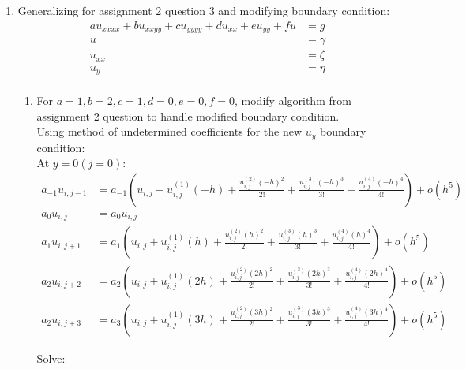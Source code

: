 \documentclass[12pt,letter]{article}
\begin{document}
\begin{enumerate}
  \pagebreak
  
\item
  
  Generalizing for assignment 2 question 3 and modifying boundary condition:\\
  \begin{align*}
    au_{xxxx} + bu_{xxyy} + cu_{yyyy} + du_{xx} + eu_{yy} + f u & = g\\
    u & = \gamma\\
    u_{xx} & =\zeta\\
    u_{y} & =\eta\\
  \end{align*}

  \begin{enumerate}
  \item For $a=1,b=2,c=1,d=0,e=0,f=0$, modify algorithm from assignment 2 question to handle modified boundary condition.\\

    Using method of undetermined coefficients for the new $u_y$ boundary condition:\\

    At $y=0 (j=0)$:
    \begin{align*}
      a_{-1} u_{i,j-1} & = a_{-1}(u_{i,j}+u_{i,j}^{(1)}(-h)+ \frac{u_{i,j}^{(2)}(-h)^2}{2!} + \frac{u_{i,j}^{(3)}(-h)^3}{3!} + \frac{u_{i,j}^{(4)}(-h)^4}{4!}) + o(h^5)\\
      a_{0} u_{i,j} & = a_{0} u_{i,j}\\
      a_{1} u_{i,j+1} & = a_{1}(u_{i,j}+u_{i,j}^{(1)}(h)+ \frac{u_{i,j}^{(2)}(h)^2}{2!} + \frac{u_{i,j}^{(3)}(h)^3}{3!} + \frac{u_{i,j}^{(4)}(h)^4}{4!}) + o(h^5)\\
      a_{2} u_{i,j+2} & = a_{2}(u_{i,j}+u_{i,j}^{(1)}(2h)+ \frac{u_{i,j}^{(2)}(2h)^2}{2!} + \frac{u_{i,j}^{(3)}(2h)^3}{3!} + \frac{u_{i,j}^{(4)}(2h)^4}{4!}) + o(h^5)\\
      a_{2} u_{i,j+3} & = a_{3}(u_{i,j}+u_{i,j}^{(1)}(3h)+ \frac{u_{i,j}^{(2)}(3h)^2}{2!} + \frac{u_{i,j}^{(3)}(3h)^3}{3!} + \frac{u_{i,j}^{(4)}(3h)^4}{4!}) + o(h^5)
    \end{align*}
    
    Solve:\\
    

\end{enumerate}
\end{enumerate}
\end{document}
